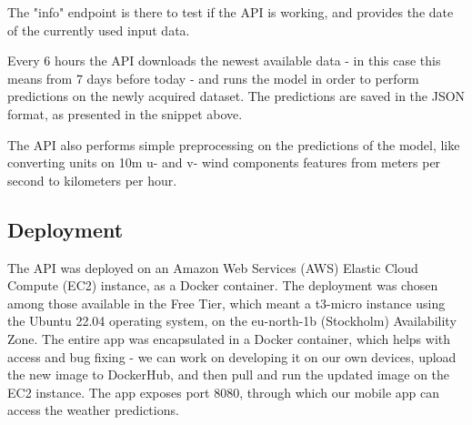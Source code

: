 

The "info" endpoint is there to test if the API is working, and provides the date of the currently used input data.

Every 6 hours the API downloads the newest available data - in this case this means from 7 days before today - and runs the model in order to perform predictions on the newly acquired dataset. The predictions are saved in the JSON format, as presented in the snippet above.

The API also performs simple preprocessing on the predictions of the model, like converting units on 10m u- and v- wind components features from meters per second to kilometers per hour.

\subsection{Deployment}
The API was deployed on an Amazon Web Services (AWS) \cite{aws} Elastic Cloud Compute (EC2) instance, as a Docker \cite{merkel2014docker} container. The deployment was chosen among those available in the Free Tier, which meant a t3-micro instance using the Ubuntu 22.04 operating system, on the eu-north-1b (Stockholm) Availability Zone. The entire app was encapsulated in a Docker container, which helps with access and bug fixing - we can work on developing it on our own devices, upload the new image to DockerHub, and then pull and run the updated image on the EC2 instance. The app exposes port 8080, through which our mobile app can access the weather predictions.

